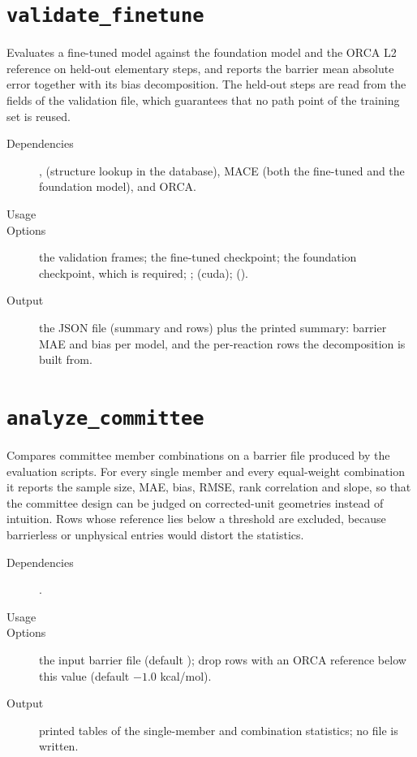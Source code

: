 \section{\texttt{validate\_finetune}}

Evaluates a fine-tuned model against the foundation model and the ORCA L2
reference on held-out elementary steps, and reports the barrier mean absolute
error together with its bias decomposition.  The held-out steps are read from
the  fields of the validation file, which guarantees that no path
point of the training set is reused.

\begin{description}
  \item[Dependencies] ,  (structure lookup in the
        database), MACE (both the fine-tuned and the foundation model), and
        ORCA.
  \item[Usage] 
  \item[Options]  the validation frames; 
        the fine-tuned checkpoint;  the foundation
        checkpoint, which is required; ; 
        (cuda);  ().
  \item[Output] the JSON file (summary and rows) plus the printed summary:
        barrier MAE and bias per model, and the per-reaction rows the
        decomposition is built from.
\end{description}

\section{\texttt{analyze\_committee}}

Compares committee member combinations on a barrier file produced by the
evaluation scripts.  For every single member and every equal-weight
combination it reports the sample size, MAE, bias, RMSE, rank correlation and
slope, so that the committee design can be judged on corrected-unit
geometries instead of intuition.  Rows whose reference lies below a
threshold are excluded, because barrierless or unphysical entries would
distort the statistics.

\begin{description}
  \item[Dependencies] .
  \item[Usage] 
  \item[Options]  the input barrier file (default
        );  drop
        rows with an ORCA reference below this value (default $-1.0$
        kcal/mol).
  \item[Output] printed tables of the single-member and combination
        statistics; no file is written.
\end{description}

